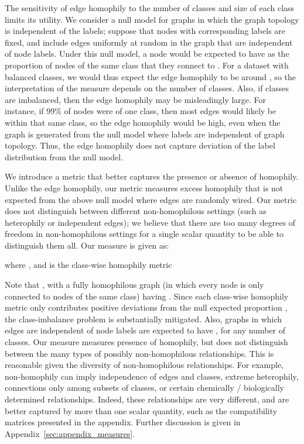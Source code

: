 \documentclass{article}
\begin{document}
The sensitivity of edge homophily to the number of classes and size of each class limits its utility.
We consider a null model for graphs in which the graph topology is independent of the labels; suppose that nodes with corresponding labels are fixed, and include edges uniformly at random in the graph that are independent of node labels.
Under this null model, a node  would be expected to have  as the proportion of nodes of the same class that they connect to \cite{altenburger2018monophily}. For a dataset with  balanced classes, we would thus expect the edge homophily to be around , so the interpretation of the measure depends on the number of classes. Also, if classes are imbalanced, then the edge homophily may be misleadingly large. For instance, if 99\% of nodes were of one class, then most edges would likely be within that same class, so the edge homophily would be high, even when the graph is generated from the null model where labels are independent of graph topology. Thus, the edge homophily does not capture deviation of the label distribution from the null model.

We introduce a metric that better captures the presence or absence of homophily. Unlike the edge homophily, our metric measures excess homophily that is not expected from the above null model where edges are randomly wired. Our metric does not distinguish between different non-homophilous settings (such as heterophily or independent edges); we believe that there are too many degrees of freedom in non-homophilous settings for a single scalar quantity to be able to distinguish them all.  Our measure is given as:

where , and  is the class-wise homophily metric

Note that , with a fully homophilous graph (in which every node is only connected to nodes of the same class) having . Since each class-wise homophily metric  only contributes positive deviations from the null expected proportion , the class-imbalance problem is substantially mitigated. Also, graphs in which edges are independent of node labels are expected to have , for any number of classes. Our measure  measures presence of homophily, but does not distinguish between the many types of possibly non-homophilous relationships. This is reasonable given the diversity of non-homophilous relationships. For example, non-homophily can imply independence of edges and classes, extreme heterophily, connections only among subsets of classes, or certain chemically / biologically determined relationships. Indeed, these relationships are very different, and are better captured by more than one scalar quantity, such as the compatibility matrices presented in the appendix. Further discussion is given in Appendix~\ref{sec:appendix_measures}.
\end{document}
